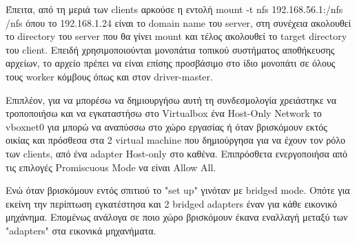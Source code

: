 \documentclass{report}
\begin{document}
Έπειτα, από τη μεριά των \textlatin{clients} αρκούσε η εντολή \textlatin{mount -t nfs} 192.168.56.1:\textlatin{/nfs} \textlatin{/nfs} όπου το 192.168.1.24 είναι το \textlatin{domain name} του \textlatin{server}, στη συνέχεια ακολουθεί το \textlatin{directory} του \textlatin{server} που θα γίνει \textlatin{mount} και τέλος ακολουθεί το \textlatin{target directory} του \textlatin{client}. Επειδή χρησιμοποιούνται μονοπάτια τοπικού συστήματος αποθήκευσης αρχείων, το αρχείο πρέπει να είναι επίσης προσβάσιμο στο ίδιο μονοπάτι σε όλους τους \textlatin{worker} κόμβους όπως και στον \textlatin{driver-master}.    

Επιπλέον, για να μπορέσω να δημιουργήσω αυτή τη συνδεσμολογία χρειάστηκε να τροποποιήσω και να εγκαταστήσω στο \textlatin{Virtualbox} ένα \textlatin{Host-Only Network} το \textlatin{vboxnet0} για μπορώ να αναπύσσω στο χώρο εργασίας ή όταν βρισκόμουν εκτός οικίας και πρόσθεσα στα 2 \textlatin{virtual machine} που δημιούργησα για να έχουν τον ρόλο των \textlatin{clients}, από ένα \textlatin{adapter Host-only} στο καθένα. Επιπρόσθετα ενεργοποιήσα από τις επιλογές \textlatin{Promiscuous Mode να είναι Allow All}.

Ενώ όταν βρισκόμουν εντός σπιτιού το \textlatin{"set up"} γινόταν με \textlatin{bridged mode}. Οπότε για εκείνη την περίπτωση εγκατέστησα και 2 \textlatin{bridged adapters} έναν για κάθε εικονικό μηχάνημα. Επομένως ανάλογα σε ποιο χώρο βρισκόμουν έκανα εναλλαγή μεταξύ των \textlatin{"adapters"} στα εικονικά μηχανήματα. 
\end{document}
